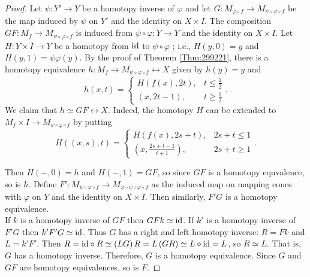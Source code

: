\begin{proof}
    Let $\psi  \colon Y' \to Y$ be a homotopy inverse
    of $\varphi $ and let $G \colon 
    M_{\varphi \circ f} \to M_{\psi \circ
    \varphi \circ f}$ be the map induced by
    $\psi $ on $Y'$ and the identity on $X \times I$.
    The composition $GF \colon M_f \to M_{\psi \circ \varphi 
    \circ f}$ is induced from $\psi \circ \varphi \colon
    Y \to Y$ and the identity on $X \times I$.
    Let $H \colon Y \times I \to Y$ be a homotopy from
    ${\mathrm{id}}$ to $\psi \circ \varphi $ ; i.e.,
    $H(y,0) = y$ and $H(y,1) = 
    \psi \varphi (y)$. 
    By the proof of Theorem \ref{Thm:299221}, there is a
    homotopy equivalence
    $h \colon M_f \to M_{\psi \circ \varphi \circ f}\rel X$ given
    by $h(y) = y$ and
     \[
    h(x,t) = 
    \begin{cases}
        H\left( f(x), 2t \right) ,& t\le \frac{1}{2}\\
        (x,2t-1),& t\ge \frac{1}{2}
    \end{cases}.
    \] 
    We claim that
    $h \simeq GF \rel X$. Indeed, the homotopy $H$ can
    be extended to 
    $M_f \times I \to M_{\psi \circ \varphi \circ f}$ by
    putting
    \[
    H\left( (x,s),t \right) 
    =
    \begin{cases}
        H\left( f(x), 2s+t \right) ,& 2s+t \le 1\\
        \left( x, \frac{2s+t-1}{t+1} \right) ,& 2s+t\ge 1
    \end{cases}.
    \] 

    Then $H\left( -,0 \right) = h$ and
    $H\left( -,1 \right) = GF$, so
    since $GF$ is a homotopy equvalence, so is
    $h$.
    Define $F' \colon
    M_{\psi \circ \varphi \circ f} \to 
    M_{\varphi \circ \psi \circ \varphi \circ f}$ 
    as the induced map on mapping cones
    with $\varphi $ on $Y$ and
    the identity on $X \times I$. Then similarly,
    $F' G$ is a homotopy equivalence.\\
    If $k$ is a homotopy inverse of $GF$ then
    $GF k \simeq {\mathrm{id}}$. If
    $k'$ is a homotopy inverse of $F'G$ then
    $k' F' G \simeq {\mathrm{id}}$. Thus $G$ has a right
    and left homotopy inverse: $R = Fk$ and
    $L = k'F'$. Then
    $R = {\mathrm{id}} \circ R \simeq 
    \left( LG \right) R =
    L \left( GR \right) \simeq L \circ {\mathrm{id}} = L$, so
    $R \simeq L$. That is, 
    $G$ has a homotopy inverse. Therefore,
    $G$ is a homotopy equivalence. Since $G$ and $GF$ are
    homotopy equivalences, so is $F$.
\end{proof}



